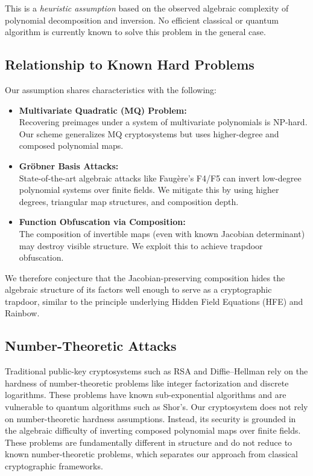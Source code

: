 \documentclass[12pt]{article}
\begin{document}
This is a \emph{heuristic assumption} based on the observed algebraic complexity of polynomial decomposition and inversion. No efficient classical or quantum algorithm is currently known to solve this problem in the general case.

\subsection*{Relationship to Known Hard Problems}

Our assumption shares characteristics with the following:

\begin{itemize}
    \item \textbf{Multivariate Quadratic (MQ) Problem:} \\
    Recovering preimages under a system of multivariate polynomials is NP-hard. Our scheme generalizes MQ cryptosystems but uses higher-degree and composed polynomial maps.
    
    \item \textbf{Gröbner Basis Attacks:} \\
    State-of-the-art algebraic attacks like Faugère's F4/F5 can invert low-degree polynomial systems over finite fields. We mitigate this by using higher degrees, triangular map structures, and composition depth.
    
    \item \textbf{Function Obfuscation via Composition:} \\
    The composition of invertible maps (even with known Jacobian determinant) may destroy visible structure. We exploit this to achieve trapdoor obfuscation.
\end{itemize}

We therefore conjecture that the Jacobian-preserving composition hides the algebraic structure of its factors well enough to serve as a cryptographic trapdoor, similar to the principle underlying Hidden Field Equations (HFE) and Rainbow.


\subsection*{Number-Theoretic Attacks}

Traditional public-key cryptosystems such as RSA and Diffie–Hellman rely on the hardness of number-theoretic problems like integer factorization and discrete logarithms. These problems have known sub-exponential algorithms and are vulnerable to quantum algorithms such as Shor’s. Our cryptosystem does not rely on number-theoretic hardness assumptions. Instead, its security is grounded in the algebraic difficulty of inverting composed polynomial maps over finite fields. These problems are fundamentally different in structure and do not reduce to known number-theoretic problems, which separates our approach from classical cryptographic frameworks.
\end{document}
